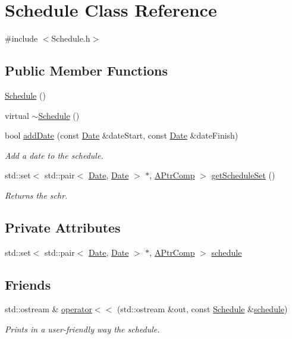 \hypertarget{classSchedule}{}\section{Schedule Class Reference}
\label{classSchedule}


{\ttfamily \#include $<$Schedule.\+h$>$}

\subsection*{Public Member Functions}
\begin{DoxyCompactItemize}
\item 
\hyperlink{classSchedule_a878716f4043a016224a14f78974edf1d}{Schedule} ()
\item 
virtual \hyperlink{classSchedule_a4806b985197d35c00b9e707c0ed87998}{$\sim$\+Schedule} ()
\item 
bool \hyperlink{classSchedule_ad7f876b27af5e115dd8dcfa2444a2897}{add\+Date} (const \hyperlink{classDate}{Date} \&date\+Start, const \hyperlink{classDate}{Date} \&date\+Finish)
\begin{DoxyCompactList}\small\item\em Add a date to the schedule. \end{DoxyCompactList}\item 
std\+::set$<$ std\+::pair$<$ \hyperlink{classDate}{Date}, \hyperlink{classDate}{Date} $>$ $\ast$, \hyperlink{structAPtrComp}{A\+Ptr\+Comp} $>$ \hyperlink{classSchedule_a8e7f2e6ddf3671f50d0c7393b5a76f13}{get\+Schedule\+Set} ()
\begin{DoxyCompactList}\small\item\em Returns the schr. \end{DoxyCompactList}\end{DoxyCompactItemize}
\subsection*{Private Attributes}
\begin{DoxyCompactItemize}
\item 
std\+::set$<$ std\+::pair$<$ \hyperlink{classDate}{Date}, \hyperlink{classDate}{Date} $>$ $\ast$, \hyperlink{structAPtrComp}{A\+Ptr\+Comp} $>$ \hyperlink{classSchedule_a1774807b89cc782ba1a3bafc93b1fb70}{schedule}
\end{DoxyCompactItemize}
\subsection*{Friends}
\begin{DoxyCompactItemize}
\item 
std\+::ostream \& \hyperlink{classSchedule_a601593037b72868ce945f1302d2a3b42}{operator$<$$<$} (std\+::ostream \&out, const \hyperlink{classSchedule}{Schedule} \&\hyperlink{classSchedule_a1774807b89cc782ba1a3bafc93b1fb70}{schedule})
\begin{DoxyCompactList}\small\item\em Prints in a user-\/friendly way the schedule. \end{DoxyCompactList}\end{DoxyCompactItemize}


